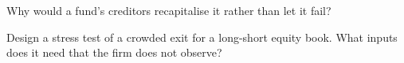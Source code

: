 \begin{interviewq}\label{iq:fm:case-studies-i:5}
Why would a fund's creditors recapitalise it rather than let it fail?
\end{interviewq}

\begin{interviewq}\label{iq:fm:case-studies-i:6}
Design a stress test of a crowded exit for a long-short equity book. What inputs does it need that the firm does not observe?
\end{interviewq}
